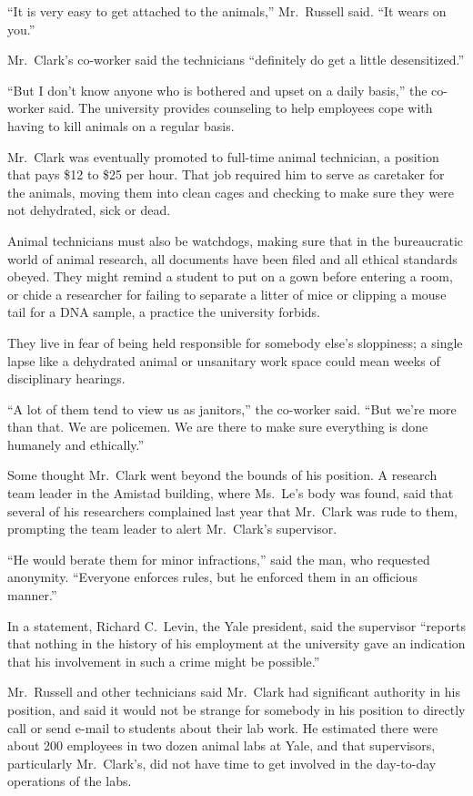 ﻿\documentclass[12pt]{article}
\begin{document}
``It is very easy to get attached to the animals,'' Mr.~Russell said. ``It wears on you.''

Mr.~Clark's co-worker said the technicians ``definitely do get a little desensitized.''

``But I don't know anyone who is bothered and upset on a daily basis,'' the co-worker said. The
university provides counseling to help employees cope with having to kill animals on a regular
basis.

Mr.~Clark was eventually promoted to full-time animal technician, a position that pays \$12 to \$25
per hour. That job required him to serve as caretaker for the animals, moving them into clean cages
and checking to make sure they were not dehydrated, sick or dead.

Animal technicians must also be watchdogs, making sure that in the bureaucratic world of animal
research, all documents have been filed and all ethical standards obeyed. They might remind a
student to put on a gown\cite{gown} before entering a room, or chide\cite{chide} a researcher for
failing to separate a litter of mice or clipping a mouse tail for a DNA sample, a practice the
university forbids.

They live in fear of being held responsible for somebody else's sloppiness; a single lapse like a
dehydrated animal or unsanitary work space could mean weeks of disciplinary hearings.

``A lot of them tend to view us as janitors\cite{janitor},'' the co-worker said. ``But we're more
than that. We are policemen. We are there to make sure everything is done humanely and ethically.''

Some thought Mr.~Clark went beyond the bounds of his position. A research team leader in the Amistad
building, where Ms.~Le's body was found, said that several of his researchers complained last year
that Mr.~Clark was rude to them, prompting the team leader to alert Mr.~Clark's supervisor.

``He would berate them for minor infractions,'' said the man, who requested anonymity. ``Everyone
enforces rules, but he enforced them in an officious manner.''

In a statement, Richard C.~Levin, the Yale president, said the supervisor ``reports that nothing in
the history of his employment at the university gave an indication that his involvement in such a
crime might be possible.''

Mr.~Russell and other technicians said Mr.~Clark had significant authority in his position, and said
it would not be strange for somebody in his position to directly call or send e-mail to students
about their lab work. He estimated there were about 200 employees in two dozen animal labs at Yale,
and that supervisors, particularly Mr.~Clark's, did not have time to get involved in the day-to-day
operations of the labs.
\end{document}
